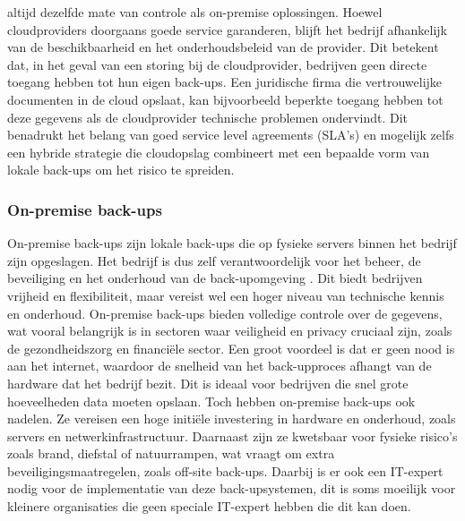 altijd dezelfde mate van controle als on-premise oplossingen. Hoewel cloudproviders doorgaans goede service garanderen, blijft het bedrijf afhankelijk van de beschikbaarheid en het onderhoudsbeleid van de provider. Dit betekent dat, in het geval van een storing bij de cloudprovider, bedrijven geen directe toegang hebben tot hun eigen back-ups. Een juridische firma die vertrouwelijke documenten in de cloud opslaat, kan bijvoorbeeld beperkte toegang hebben tot deze gegevens als de cloudprovider technische problemen ondervindt. Dit benadrukt het belang van goed service level agreements (SLA's) en mogelijk zelfs een hybride strategie die cloudopslag combineert met een bepaalde vorm van lokale back-ups om het risico te spreiden.

\subsubsection{On-premise back-ups}
On-premise back-ups zijn lokale back-ups die op fysieke servers binnen het bedrijf zijn opgeslagen. Het bedrijf is dus zelf verantwoordelijk voor het beheer, de beveiliging en het onderhoud van de back-upomgeving \autocite{Trovato2019}. Dit biedt bedrijven vrijheid en flexibiliteit, maar vereist wel een hoger niveau van technische kennis en onderhoud. On-premise back-ups bieden volledige controle over de gegevens, wat vooral belangrijk is in sectoren waar veiligheid en privacy cruciaal zijn, zoals de gezondheidszorg en financiële sector. Een groot voordeel is dat er geen nood is aan het internet, waardoor de snelheid van het back-upproces afhangt van de hardware dat het bedrijf bezit. Dit is ideaal voor bedrijven die snel grote hoeveelheden data moeten opslaan. Toch hebben on-premise back-ups ook nadelen. Ze vereisen een hoge initiële investering in hardware en onderhoud, zoals servers en netwerkinfrastructuur. Daarnaast zijn ze kwetsbaar voor fysieke risico’s zoals brand, diefstal of natuurrampen, wat vraagt om extra beveiligingsmaatregelen, zoals off-site back-ups. Daarbij is er ook een IT-expert nodig voor de implementatie van deze back-upsystemen, dit is soms moeilijk voor kleinere organisaties die geen speciale IT-expert hebben die dit kan doen.


